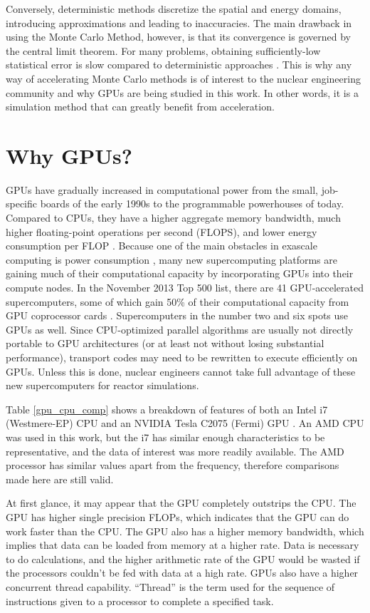 Conversely, deterministic methods discretize the spatial and energy domains, introducing approximations and leading to inaccuracies.  The main drawback in using the Monte Carlo Method, however, is that its convergence is governed by the central limit theorem. For many problems, obtaining sufficiently-low statistical error is slow compared to deterministic approaches \cite{jaakko,openmc}.  This is why any way of accelerating Monte Carlo methods is of interest to the nuclear engineering community and why GPUs are being studied in this work.  In other words, it is a simulation method that can greatly benefit from acceleration. 

\section{Why GPUs?}

GPUs have gradually increased in computational power from the small, job-specific boards of the early 1990s to the programmable powerhouses of today.  Compared to CPUs, they have a higher aggregate memory bandwidth, much higher floating-point operations per second (FLOPS), and lower energy consumption per FLOP \cite{cuda}.  Because one of the main obstacles in exascale computing is power consumption \cite{exascale}, many new supercomputing platforms are gaining much of their computational capacity by incorporating GPUs into their compute nodes.  In the November 2013 Top 500 list, there are 41 GPU-accelerated supercomputers, some of which gain 50\% of their computational capacity from GPU coprocessor cards \cite{top500}.  Supercomputers in the number two and six spots use GPUs as well.  Since CPU-optimized parallel algorithms are usually not directly portable to GPU architectures (or at least not without losing substantial performance), transport codes may need to be rewritten to execute efficiently on GPUs.  Unless this is done, nuclear engineers cannot take full advantage of these new supercomputers for reactor simulations.

Table \ref{gpu_cpu_comp} shows a breakdown of features of both an Intel i7 (Westmere-EP) CPU and an NVIDIA Tesla C2075 (Fermi) GPU \cite{cent, cpu_latency}.  An AMD CPU was used in this work, but the i7 has similar enough characteristics to be representative, and the data of interest was more readily available.  The AMD processor has similar values apart from the frequency, therefore comparisons made here are still valid.  

At first glance, it may appear that the GPU completely outstrips the CPU.  The GPU has higher single precision FLOPs, which indicates that the GPU can do work faster than the CPU.  The GPU also has a higher memory bandwidth, which implies that data can be loaded from memory at a higher rate.  Data is necessary to do calculations, and the higher arithmetic rate of the GPU would be wasted if the processors couldn't be fed with data at a high rate.  GPUs also have a higher concurrent thread capability.  ``Thread'' is the term used for the sequence of instructions given to a processor to complete a specified task.  

